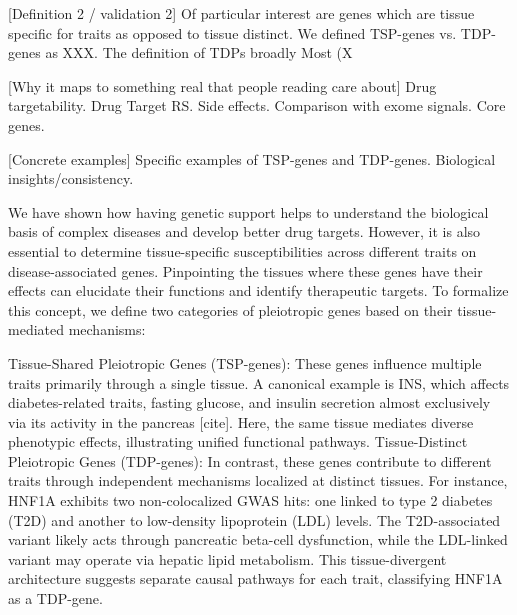 [Definition 2 / validation 2] Of particular interest are genes which are tissue specific for traits as opposed to tissue distinct. We defined TSP-genes vs. TDP-genes as XXX. The definition of TDPs broadly Most (X%

[Why it maps to something real that people reading care about] Drug targetability. Drug Target RS. Side effects. Comparison with exome signals. Core genes.

[Concrete examples] Specific examples of TSP-genes and TDP-genes. Biological insights/consistency.

We have shown how having genetic support helps to understand the biological basis of complex diseases and develop better drug targets. However, it is also essential to determine tissue-specific susceptibilities across different traits on disease-associated genes. Pinpointing the tissues where these genes have their effects can elucidate their functions and identify therapeutic targets. To formalize this concept, we define two categories of pleiotropic genes based on their tissue-mediated mechanisms:

Tissue-Shared Pleiotropic Genes (TSP-genes): These genes influence multiple traits primarily through a single tissue. A canonical example is INS, which affects diabetes-related traits, fasting glucose, and insulin secretion almost exclusively via its activity in the pancreas [cite]. Here, the same tissue mediates diverse phenotypic effects, illustrating unified functional pathways. Tissue-Distinct Pleiotropic Genes (TDP-genes): In contrast, these genes contribute to different traits through independent mechanisms localized at distinct tissues. For instance, HNF1A exhibits two non-colocalized GWAS hits: one linked to type 2 diabetes (T2D) and another to low-density lipoprotein (LDL) levels. The T2D-associated variant likely acts through pancreatic beta-cell dysfunction, while the LDL-linked variant may operate via hepatic lipid metabolism. This tissue-divergent architecture suggests separate causal pathways for each trait, classifying HNF1A as a TDP-gene.

